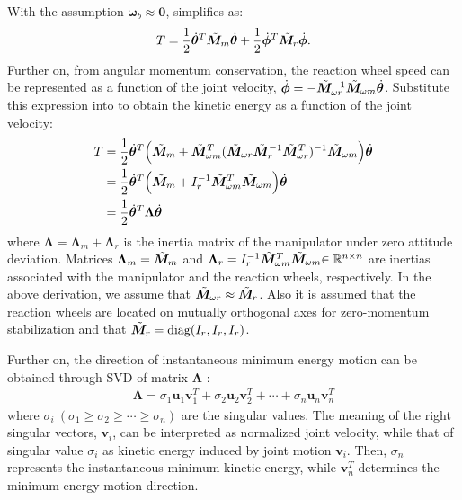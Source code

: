 With the assumption $\bm{\omega}_{b} \approx \bm{0}$,   simplifies as:
%
\begin{align}
  T = \frac{1}{2}{\dot{\bm{\theta}}}^{T}{\tilde{\bm{M}}}_{m}{\dot{\bm{\theta}}} + \frac{1}{2}{\dot{{\bm{\phi}}}}^{T}{\tilde{\bm{M}}}_{r}{\dot{{\bm{\phi}}}}.
\label{eq:kin2}
\end{align}
%
Further on, from angular momentum conservation,
the reaction wheel speed can be represented as a function of the joint velocity,
${\dot{{\bm{\phi}}}} = -{\tilde{\bm{M}}}_{\omega r}^{-1}{\tilde{\bm{M}}}_{\omega m}{\dot{\bm{\theta}}}$.
Substitute this expression  into  
to obtain the kinetic energy as a function of the joint velocity:
%
\begin{align}
  T &= \frac{1}{2}{\dot{\bm{\theta}}}^{T}\Big({\tilde{\bm{M}}}_{m} + 
  {\tilde{\bm{M}}}_{\omega m}^{T}({\tilde{\bm{M}}}_{\omega r}{\tilde{\bm{M}}}_{r}^{-1}{\tilde{\bm{M}}}_{\omega r}^{T})^{-1}{\tilde{\bm{M}}}_{\omega m}\Big){\dot{\bm{\theta}}} \notag\\
  &= \frac{1}{2}{\dot{\bm{\theta}}}^{T}\Big({\tilde{\bm{M}}}_{m} + I_{r}^{-1}{\tilde{\bm{M}}}_{\omega m}^{T}{\tilde{\bm{M}}}_{\omega m}\Big){\dot{\bm{\theta}}} \notag\\
  &= \frac{1}{2}{\dot{\bm{\theta}}}^{T}\bm{\Lambda}{\dot{\bm{\theta}}}\label{eq:kin}
\end{align}
%
where $\bm{\Lambda} = \bm{\Lambda}_{m} + \bm{\Lambda}_{r}$ is the inertia matrix of the manipulator
under zero attitude deviation. Matrices 
$\bm{\Lambda}_{m} = {\tilde{\bm{M}}}_{m}$ and
$\bm{\Lambda}_{r} = I_{r}^{-1}{\tilde{\bm{M}}}_{\omega m}^{T}{\tilde{\bm{M}}}_{\omega m}{\in\mathbb{R}^{n \times n}}$ are
inertias associated with the manipulator and the reaction wheels, respectively.
In the above derivation,  we assume that ${\tilde{\bm{M}}}_{\omega r} \approx {\tilde{\bm{M}}}_{r}$.
Also it is assumed that the reaction wheels are located on mutually orthogonal axes 
for zero-momentum stabilization and that  ${\tilde{\bm{M}}}_{r} = \mathrm{diag}(I_{r},I_{r},I_{r})$.

Further on, the direction of instantaneous minimum energy motion can be obtained through SVD of
 matrix $\bm{\Lambda}$ \cite{Torres1993}:
%
\begin{align}
  \bm{\Lambda} = \sigma_{1}\bm{u}_{1}\bm{v}_{1}^{T} + \sigma_{2}\bm{u}_{2}\bm{v}_{2}^{T} 
     + \cdots + \sigma_{n}\bm{u}_{n}\bm{v}_{n}^{T}
  \label{eq:svd}
\end{align}
%
where  $\sigma_{i}~(\sigma_{1} \geq \sigma_{2} \geq \cdots \geq \sigma_{n})$ are the singular values.
The meaning of the right singular vectors, $\bm{v}_{i}$, can be interpreted as normalized 
joint velocity, while that of singular value $\sigma_{i}$ as kinetic energy induced 
by  joint motion $\bm{v}_{i}$. Then, $\sigma_{n}$ represents the instantaneous minimum 
kinetic energy, while $\bm{v}_{n}^{T}$ determines the minimum energy motion direction.

